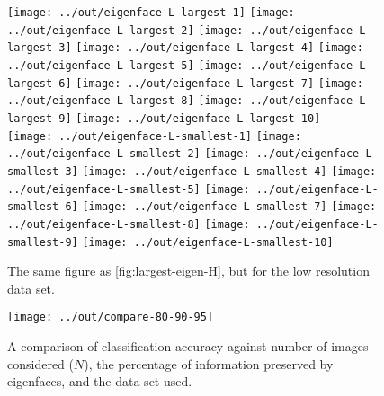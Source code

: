 \documentclass[headings=optiontoheadandtoc,listof=totoc,parskip=full]{scrartcl}
\begin{document}
\begin{figure}[H]
	\centering
	\texttt{[image: ../out/eigenface-L-largest-1]}
	\texttt{[image: ../out/eigenface-L-largest-2]}
	\texttt{[image: ../out/eigenface-L-largest-3]}
	\texttt{[image: ../out/eigenface-L-largest-4]}
	\texttt{[image: ../out/eigenface-L-largest-5]}
	\texttt{[image: ../out/eigenface-L-largest-6]}
	\texttt{[image: ../out/eigenface-L-largest-7]}
	\texttt{[image: ../out/eigenface-L-largest-8]}
	\texttt{[image: ../out/eigenface-L-largest-9]}
	\texttt{[image: ../out/eigenface-L-largest-10]}\\
	\texttt{[image: ../out/eigenface-L-smallest-1]}
	\texttt{[image: ../out/eigenface-L-smallest-2]}
	\texttt{[image: ../out/eigenface-L-smallest-3]}
	\texttt{[image: ../out/eigenface-L-smallest-4]}
	\texttt{[image: ../out/eigenface-L-smallest-5]}
	\texttt{[image: ../out/eigenface-L-smallest-6]}
	\texttt{[image: ../out/eigenface-L-smallest-7]}
	\texttt{[image: ../out/eigenface-L-smallest-8]}
	\texttt{[image: ../out/eigenface-L-smallest-9]}
	\texttt{[image: ../out/eigenface-L-smallest-10]}
	\caption{The same figure as \cref{fig:largest-eigen-H}, but for the low resolution data set.}
	\label{fig:largest-eigen-L}
\end{figure}

\begin{figure}[H]
	\centering
	\texttt{[image: ../out/compare-80-90-95]}
	\caption{A comparison of classification accuracy against number of images considered ($N$), the percentage of information preserved by eigenfaces, and the data set used.}
	\label{fig:classification-accuracy-H}
\end{figure}
\end{document}

